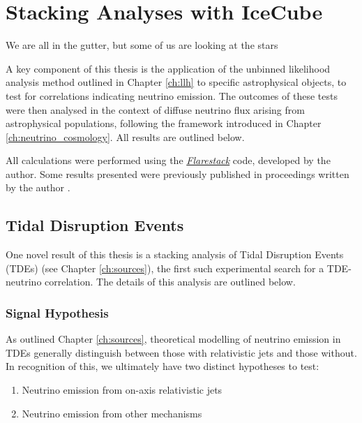 \setchapterpreamble[u]{\margintoc}
\chapter{Stacking Analyses with IceCube}
\begin{fquote}We are all in the gutter, but some of us are looking at the stars
\end{fquote}

A key component of this thesis is the application of the unbinned likelihood analysis method outlined in Chapter \ref{ch:llh} to specific astrophysical objects, to test for correlations indicating neutrino emission. The outcomes of these tests were then analysed in the context of diffuse neutrino flux arising from astrophysical populations, following the framework introduced in Chapter \ref{ch:neutrino_cosmology}. All results are outlined below.

All calculations were  performed using the \emph{\href{https://github.com/IceCubeOpenSource/flarestack}{Flarestack}} code, developed by the author. Some results presented were previously published in proceedings written by the author .

\section{Tidal Disruption Events}

One novel result of this thesis is a stacking analysis of Tidal Disruption Events (TDEs) (see Chapter \ref{ch:sources}), the first such experimental search for a TDE-neutrino correlation. The details of this analysis are outlined below.

\subsection{Signal Hypothesis}

As outlined Chapter \ref{ch:sources}, theoretical modelling of neutrino emission in TDEs generally distinguish between those with relativistic jets and those without. In recognition of this, we ultimately have two distinct hypotheses to test:

\begin{enumerate}
	\item Neutrino emission from on-axis relativistic jets
	\item Neutrino emission from other mechanisms
\end{enumerate}

